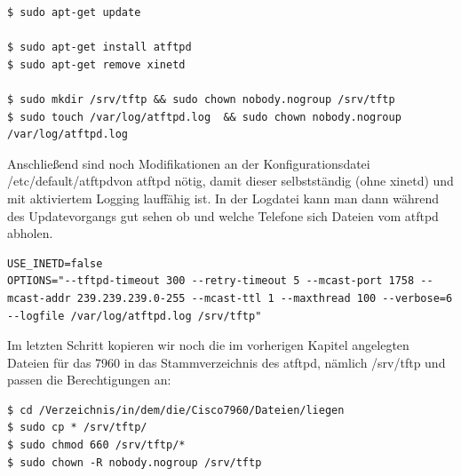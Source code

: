 \documentclass[a4paper,12pt]{scrbook}
\begin{document}
\begin{lstlisting}[caption={Installation von atftp unter ubuntu},label=lst:atftpdinstall]
$ sudo apt-get update

$ sudo apt-get install atftpd
$ sudo apt-get remove xinetd

$ sudo mkdir /srv/tftp && sudo chown nobody.nogroup /srv/tftp
$ sudo touch /var/log/atftpd.log  && sudo chown nobody.nogroup /var/log/atftpd.log
\end{lstlisting}

Anschließend sind noch Modifikationen an der Konfigurationsdatei /etc/default/atftpdvon atftpd nötig, damit dieser selbstständig (ohne xinetd) und mit aktiviertem Logging
lauffähig ist. In der Logdatei kann man dann während des Updatevorgangs gut sehen ob und welche Telefone sich Dateien vom atftpd abholen.

\begin{lstlisting}[caption={atftpd-Konfigurationsdatei /etc/default/atftpd},label=lst:atftpdconfig]
USE_INETD=false
OPTIONS="--tftpd-timeout 300 --retry-timeout 5 --mcast-port 1758 --mcast-addr 239.239.239.0-255 --mcast-ttl 1 --maxthread 100 --verbose=6 --logfile /var/log/atftpd.log /srv/tftp"
\end{lstlisting}

Im letzten Schritt kopieren wir noch die im vorherigen Kapitel angelegten Dateien für das 7960 in das Stammverzeichnis des atftpd, nämlich /srv/tftp und passen die Berechtigungen an:
\begin{lstlisting}
$ cd /Verzeichnis/in/dem/die/Cisco7960/Dateien/liegen
$ sudo cp * /srv/tftp/
$ sudo chmod 660 /srv/tftp/*
$ sudo chown -R nobody.nogroup /srv/tftp
\end{lstlisting}
\end{document}
